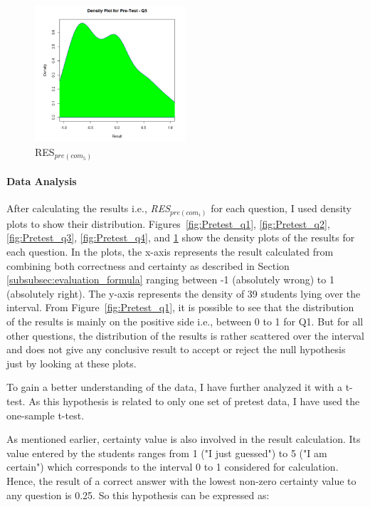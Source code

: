 \begin{figure}
	\centering
	\includegraphics[width=0.5\textwidth]{figures/Pretest_q5}
	\caption{RES$_{pre(com_5)}$}
	\label{fig:Pretest_q5}
\end{figure}

\paragraph{Data Analysis}
After calculating the results i.e., \textit{RES$_{pre(com_i)}$} for each question, I used density plots to show their distribution. Figures~\ref{fig:Pretest_q1}, \ref{fig:Pretest_q2}, \ref{fig:Pretest_q3}, \ref{fig:Pretest_q4}, and \ref{fig:Pretest_q5} show the density plots of the results for each question. In the plots, the x-axis represents the result calculated from combining both correctness and certainty as described in Section \ref{subsubsec:evaluation_formula} ranging between -1 (absolutely wrong) to 1 (absolutely right). The y-axis represents the density of 39 students lying over the interval. From Figure~\ref{fig:Pretest_q1}, it is possible to see that the distribution of the results is mainly on the positive side i.e., between 0 to 1 for Q1. But for all other questions, the distribution of the results is rather scattered over the interval and does not give any conclusive result to accept or reject the null hypothesis just by looking at these plots.

To gain a better understanding of the data, I have further analyzed it with a t-test. As this hypothesis is related to only one set of pretest data, I have used the one-sample t-test.   

As mentioned earlier, certainty value is also involved in the result calculation. Its value entered by the students ranges from 1 ("I just guessed") to 5 ("I am certain") which corresponds to the interval 0 to 1 considered for calculation. Hence, the result of a correct answer with the lowest non-zero certainty value to any question is 0.25. So this hypothesis can be expressed as:   

